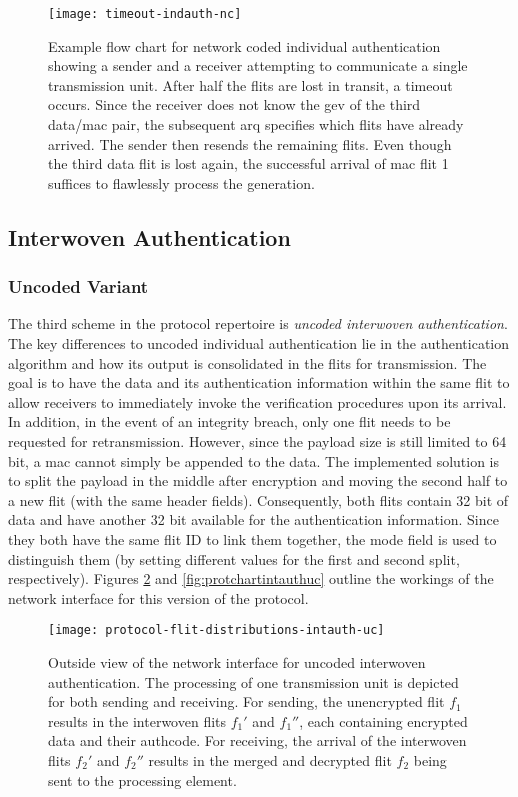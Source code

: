 \begin{figure}
    \centering
    \texttt{[image: timeout-indauth-nc]}
    \caption[Example flow chart for network coded ind. auth. with many losses]{Example flow chart for network coded individual authentication showing
    a sender and a receiver attempting to communicate a single transmission unit. After half the flits are lost in transit, a timeout occurs. Since
    the receiver does not know the \gls{gev} of the third data/\gls{mac} pair, the subsequent \gls{arq} specifies which flits have already arrived.
    The sender then resends the remaining flits. Even though the third data flit is lost again, the successful arrival of \gls{mac} flit 1 suffices to
    flawlessly process the generation.}
    \label{fig:timeoutindauthnc}
\end{figure}

\subsection{Interwoven Authentication}\label{subsec:intauth}
\subsubsection{Uncoded Variant}
The third scheme in the protocol repertoire is \textit{uncoded interwoven authentication}. The key differences to uncoded individual authentication
lie in the authentication algorithm and how its output is consolidated in the flits for transmission. The goal is to have the data and its
authentication information within the same flit to allow receivers to immediately invoke the verification procedures
upon its arrival. In addition, in the event of an integrity breach, only one flit needs to be requested for retransmission. However, since the payload
size is still limited to 64 bit, a \gls{mac} cannot simply be appended to the data. The implemented
solution is to split the payload in the middle after encryption and moving the second half to a new flit (with the same header fields). Consequently,
both flits contain 32 bit of data and have another 32 bit available for the authentication information. Since they both have the same flit ID to link
them together, the mode field is used to distinguish them (by setting different values for the first and second split, respectively). Figures
\ref{fig:protflitdistintauthuc} and \ref{fig:protchartintauthuc} outline the workings of the network interface for this version of the protocol.

\begin{figure}
    \centering
    \texttt{[image: protocol-flit-distributions-intauth-uc]}
    \caption[Uncoded int. auth., outside view]{Outside view of the network interface for uncoded interwoven authentication. The processing of one
    transmission unit is depicted for both sending and receiving. For sending, the unencrypted flit $f_1$ results in the interwoven flits $f_1'$ and
    $f_1''$, each containing encrypted data and their authcode. For receiving, the arrival of the interwoven flits $f_2'$ and $f_2''$ results in the
    merged and decrypted flit $f_2$ being sent to the processing element.}
    \label{fig:protflitdistintauthuc}
\end{figure}

